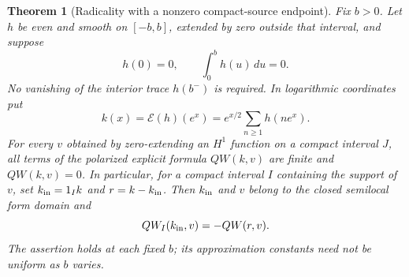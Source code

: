 \documentclass[11pt]{article}
\newtheorem{theorem}{Theorem}[section]
\theoremstyle{remark}
\begin{document}
\begin{theorem}[Radicality with a nonzero compact-source endpoint]
\label{thm:v14-radical}
Fix $b>0$. Let $h$ be even and smooth on $[-b,b]$, extended by zero
outside that interval, and suppose
\[
 h(0)=0,\qquad \int_0^b h(u)\,du=0.
\]
No vanishing of the interior trace $h(b^-)$ is required. In logarithmic
coordinates put
\[
 k(x)=\mathcal E(h)(e^x)=e^{x/2}\sum_{n\ge1}h(ne^x).
\]
For every $v$ obtained by zero-extending an $H^1$ function on a compact
interval $J$, all terms of the polarized explicit formula $QW(k,v)$ are
finite and $QW(k,v)=0$. In particular, for a compact interval $I$
containing the support of $v$, set $k_{\rm in}=1_I k$ and
$r=k-k_{\rm in}$. Then $k_{\rm in}$ and $v$ belong to the closed
semilocal form domain and
\[
 QW_I(k_{\rm in},v)=-QW(r,v).
\]
The assertion holds at each fixed $b$; its approximation constants need
not be uniform as $b$ varies.
\end{theorem}
\end{document}
